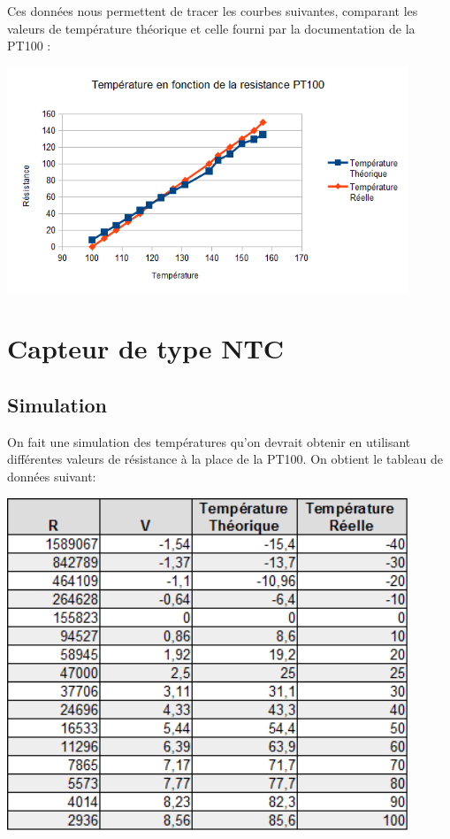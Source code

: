 \documentclass[a4paper,12pt]{article}
\begin{document}
      \par Ces données nous permettent de tracer les courbes suivantes, comparant les valeurs de température théorique et celle fourni par la documentation de la PT100 :
			\begin{center}
				\includegraphics[width=12cm]{../Images/GraphPT100.png}
			\end{center}
    \newpage

  \section{Capteur de type NTC}
		\subsection{Simulation}
			\par On fait une simulation des températures qu'on devrait obtenir en utilisant différentes valeurs de résistance à la place de la PT100.
			On obtient le tableau de données suivant:
			\begin{center}
				\includegraphics[width=12cm]{../Images/TabNTC.png}
			\end{center}
\end{document}
